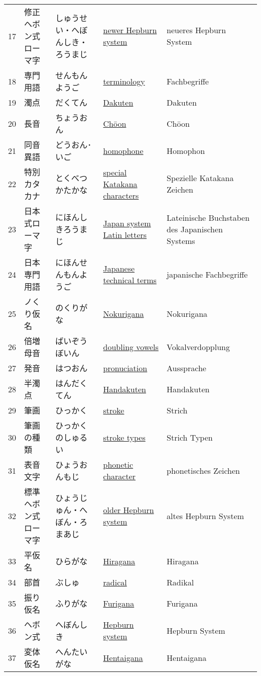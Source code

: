 \begin{longtable}[c]{p{.5cm}p{3.5cm}p{4cm}p{3.5cm}p{3.5cm}}
17&修正ヘボン式ローマ字&しゅうせい・へぼんしき・ろうまじ&\hyperref[sec:NewerHepburnSystem]{newer Hepburn system}&neueres Hepburn System\\
18&専門用語&せんもんようご&\hyperref[sec:Terminology]{terminology}&Fachbegriffe\\
19&濁点&だくてん&\hyperref[sec:Dakuten]{Dakuten}&Dakuten\\
20&長音&ちょうおん&\hyperref[sec:Choon]{Chōon}&Chōon\\
21&同音異語&どうおん･いご&\hyperref[sec:Homophone]{homophone}&Homophon\\
22&特別カタカナ&とくべつかたかな&\hyperref[sec:SpecialKatakanaCharacters]{special Katakana characters}&Spezielle Katakana Zeichen\\
23&日本式ローマ字&にほんしきろうまじ&\hyperref[sec:JapanSystemLatinLetters]{Japan system Latin letters}&Lateinische Buchstaben des Japanischen Systems\\
24&日本専門用語&にほんせんもんようご&\hyperref[sec:JapaneseTechnicalTerms]{Japanese technical terms}&japanische Fachbegriffe\\
25&ノくり仮名&のくりがな&\hyperref[sec:Nokurigana]{Nokurigana}&Nokurigana\\
26&倍増母音&ばいぞうぼいん&\hyperref[sec:DoublingVowels]{doubling vowels}&Vokalverdopplung\\
27&発音&はつおん&\hyperref[sec:Pronuciation]{pronuciation}&Aussprache\\
28&半濁点&はんだくてん&\hyperref[sec:Handakuten]{Handakuten}&Handakuten\\
29&筆画&ひっかく&\hyperref[sec:Stroke]{stroke}&Strich\\
30&筆画の種類&ひっかくのしゅるい&\hyperref[sec:StrokeTypes]{stroke types}&Strich Typen\\
31&表音文字&ひょうおんもじ&\hyperref[sec:PhoneticCharacter]{phonetic character}&phonetisches Zeichen\\
32&標準ヘボン式ローマ字&ひょうじゅん・へぼん・ろまあじ&\hyperref[sec:OlderHepburnSystem]{older Hepburn system}&altes Hepburn System\\
33&平仮名&ひらがな&\hyperref[sec:Hiragana]{Hiragana}&Hiragana\\
34&部首&ぶしゅ&\hyperref[sec:Radical]{radical}&Radikal\\
35&振り仮名&ふりがな&\hyperref[sec:Furigana]{Furigana}&Furigana\\
36&ヘボン式&へぼんしき&\hyperref[sec:HepburnSystem]{Hepburn system}&Hepburn System\\
37&変体仮名&へんたいがな&\hyperref[sec:Hentaigana]{Hentaigana}&Hentaigana\\

\end{longtable}
